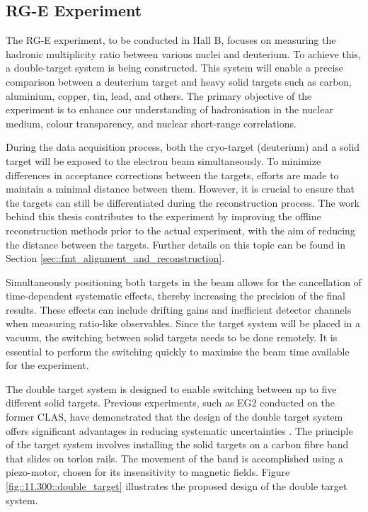 \subsection{RG-E Experiment}
\label{11.300::rge_experiment}
    The RG-E experiment, to be conducted in Hall B, focuses on measuring the hadronic multiplicity ratio between various nuclei and deuterium.
    To achieve this, a double-target system is being constructed.
    This system will enable a precise comparison between a deuterium target and heavy solid targets such as carbon, aluminium, copper, tin, lead, and others.
    The primary objective of the experiment is to enhance our understanding of hadronisation in the nuclear medium, colour transparency, and nuclear short-range correlations.

    During the data acquisition process, both the cryo-target (deuterium) and a solid target will be exposed to the electron beam simultaneously.
    To minimize differences in acceptance corrections between the targets, efforts are made to maintain a minimal distance between them.
    However, it is crucial to ensure that the targets can still be differentiated during the reconstruction process.
    The work behind this thesis contributes to the experiment by improving the offline reconstruction methods prior to the actual experiment, with the aim of reducing the distance between the targets.
    Further details on this topic can be found in Section \ref{sec::fmt_alignment_and_reconstruction}.

    Simultaneously positioning both targets in the beam allows for the cancellation of time-dependent systematic effects, thereby increasing the precision of the final results.
    These effects can include drifting gains and inefficient detector channels when measuring ratio-like observables.
    Since the target system will be placed in a vacuum, the switching between solid targets needs to be done remotely.
    It is essential to perform the switching quickly to maximise the beam time available for the experiment.

    The double target system is designed to enable switching between up to five different solid targets.
    Previous experiments, such as EG2 conducted on the former CLAS, have demonstrated that the design of the double target system offers significant advantages in reducing systematic uncertainties \cite{hakobyan2008}.
    The principle of the target system involves installing the solid targets on a carbon fibre band that slides on torlon rails.
    The movement of the band is accomplished using a piezo-motor, chosen for its insensitivity to magnetic fields.
    Figure \ref{fig::11.300::double_target} illustrates the proposed design of the double target system.


